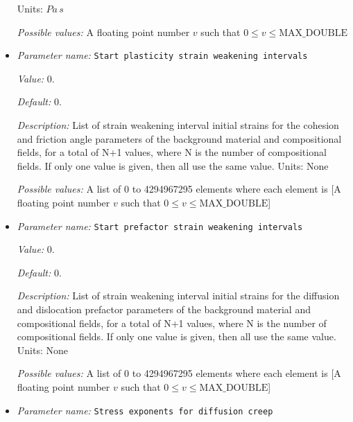 \begin{itemize}
Units: $Pa \, s$


{\it Possible values:} A floating point number $v$ such that $0 \leq v \leq \text{MAX\_DOUBLE}$
\item {\it Parameter name:} {\tt Start plasticity strain weakening intervals}
\label{parameters:Material model/Visco Plastic/Start plasticity strain weakening intervals}
\label{parameters:Material_20model/Visco_20Plastic/Start_20plasticity_20strain_20weakening_20intervals}


{\it Value:} 0.


{\it Default:} 0.


{\it Description:} List of strain weakening interval initial strains for the cohesion and friction angle parameters of the background material and compositional fields, for a total of N+1 values, where N is the number of compositional fields. If only one value is given, then all use the same value.  Units: None


{\it Possible values:} A list of 0 to 4294967295 elements where each element is [A floating point number $v$ such that $0 \leq v \leq \text{MAX\_DOUBLE}$]
\item {\it Parameter name:} {\tt Start prefactor strain weakening intervals}
\label{parameters:Material model/Visco Plastic/Start prefactor strain weakening intervals}
\label{parameters:Material_20model/Visco_20Plastic/Start_20prefactor_20strain_20weakening_20intervals}


{\it Value:} 0.


{\it Default:} 0.


{\it Description:} List of strain weakening interval initial strains for the diffusion and dislocation prefactor parameters of the background material and compositional fields, for a total of N+1 values, where N is the number of compositional fields. If only one value is given, then all use the same value.  Units: None


{\it Possible values:} A list of 0 to 4294967295 elements where each element is [A floating point number $v$ such that $0 \leq v \leq \text{MAX\_DOUBLE}$]
\item {\it Parameter name:} {\tt Stress exponents for diffusion creep}
\label{parameters:Material model/Visco Plastic/Stress exponents for diffusion creep}
\label{parameters:Material_20model/Visco_20Plastic/Stress_20exponents_20for_20diffusion_20creep}



\end{itemize}
